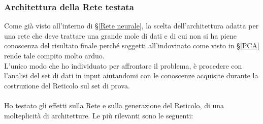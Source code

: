 \subsubsection{Architettura della Rete testata}
\label{Architettura della Rete testata 89}
Come già visto all'interno di §\ref{Rete neurale}, la scelta dell'architettura adatta per una rete che deve trattare una grande mole di dati e di cui non si ha piene conoscenza del risultato finale perché soggetti all'indovinato come visto in §\ref{PCA} rende tale compito molto arduo.\\
L'unico modo che ho individuato per affrontare il problema, è procedere con l'analisi del set di dati in input aiutandomi con le conoscenze acquisite durante la costruzione del Reticolo sul set di prova.\\\\
\noindent
Ho testato gli effetti sulla Rete e sulla generazione del Reticolo, di una molteplicit\`a di architetture. Le pi\`u rilevanti sono le seguenti:
